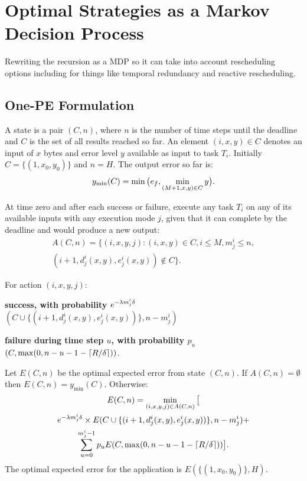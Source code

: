 \chapter{Optimal Strategies as a Markov Decision Process}
\label{sec:mdp}

Rewriting the recursion as a MDP so it can take into account rescheduling options
including for things like temporal redundancy and reactive rescheduling.

\section{One-PE Formulation}
\label{sec:mdp:onepe}

A state is a pair $(C, n)$, where $n$ is the number of time steps until
the deadline and $C$ is the set of all results reached so far. An element
$(i, x, y) \in C$ denotes an input of $x$ bytes and error level $y$ available
as input to task $T_i$.
Initially $C = \{(1, x_0, y_0)\}$ and $n = H$.  The output error so far is:
$$
y_{\min} (C) = \min\big(e_{f}, \min_{(M+1, x, y) \in C} y\big).
$$

At time zero and after each success or failure, execute any task $T_i$ on
any of its available inputs with any execution mode $j$, given that it
can complete by the deadline and would produce a new output:
\begin{multline*}
A(C, n) = \{ (i, x, y, j) : (i, x, y) \in C, i \leq M, m^i_j \leq n,\\
(i+1, d^i_j(x,y), e^i_j(x,y)) \notin C \}.
\end{multline*}

For action $(i, x, y, j)$:
\begin{compactitem}
\item \textbf{success, with probability $e^{-\lambda m^i_j \delta}$} \\
$(C \cup \{(i+1, d^i_j(x,y), e^i_j(x,y))\}, n - m^i_j)$
\item \textbf{failure during time step $u$, with probability $p_u$}\\ 
$(C, \max(0, n - u - 1 - \lceil R/\delta \rceil))$.
\end{compactitem}

Let $E(C,n)$ be the optimal expected error from state $(C,n)$.  If
$A(C,n) = \emptyset$ then $E(C,n) = y_{\min}(C)$. Otherwise:
\begin{multline*}
E(C, n) = \min_{(i,x,y,j) \in A(C,n)} \big[\\
e^{-\lambda m^i_j \delta} \times E(C \cup \{(i+1, d^i_j(x,y), e^i_j(x,y))\}, n - m^i_j) + \\
 \sum_{u=0}^{m^i_j - 1} p_u E(C, \max(0, n - u - 1 - \lceil R/\delta \rceil)) \big].
\end{multline*}
The optimal expected error for the application is $E(\{(1, x_0, y_0)\}, H)$.

